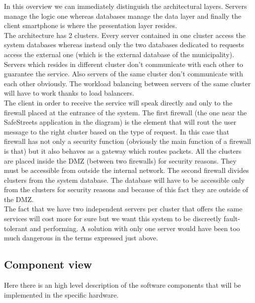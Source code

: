 \documentclass[titlepage]{article}
\begin{document}
In this overview we can immediately distinguish the architectural layers. Servers manage the logic one whereas databases manage the data layer and finally the client smartphone is where the presentation layer resides. \\
The architecture has 2 clusters. Every server contained in one cluster access the system databases whereas instead only the two databases dedicated to requests access the external one (which is the external database of the municipality). Servers which resides in different cluster don't communicate with each other to guarantee the service. Also servers of the same cluster don't communicate with each other obviously. The workload balancing between servers of the same cluster will have to work thanks to load balancers.\\
The client in order to receive the service will speak directly and only to the firewall placed at the entrance of the system. The first firewall (the one near the SafeStreets application in the diagram) is the element that will rout the user message to the right cluster based on the type of request. In this case that firewall has not only a security function (obviously the main function of a firewall is that) but it also behaves as a gateway which routes packets. All the clusters are placed inside the DMZ (between two firewalls) for security reasons. They must be accessible from outside the internal network. The second firewall divides clusters from the system database. The database will have to be accessible only from the clusters for security reasons and because of this fact they are outside of the DMZ.\\
The fact that we have two independent servers per cluster that offers the same services will cost more for sure but we want this system to be discreetly fault-tolerant and performing. A solution with only one server would have been too much dangerous in the terms expressed just above.
\subsection{Component view}
Here there is an high level description of the software components that will be implemented in the specific hardware.
\end{document}
